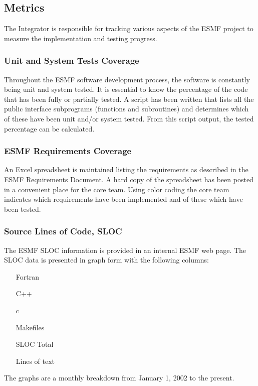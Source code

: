 \subsection{Metrics}

The Integrator is responsible for tracking various aspects of the
ESMF project to measure the implementation and testing progress.

\subsubsection{Unit and System Tests Coverage}
Throughout the ESMF software development process, the software is constantly
being unit and system tested. It is essential to know the percentage of the
code that has been fully or partially tested. A script has been written that 
lists all the public interface subprograms (functions and subroutines) and 
determines which of these have been unit and/or system tested. From this script
output, the tested percentage can be calculated.

\subsubsection{ESMF Requirements Coverage}
An Excel spreadsheet is maintained listing the requirements as described in the
ESMF Requirements Document. A hard copy of the spreadsheet has been posted in a
convenient place for the core team. Using color coding the core team indicates
which requirements have been implemented and of these which have been tested.

\subsubsection{Source Lines of Code, SLOC}
The ESMF SLOC information is provided in an internal ESMF web page. The
SLOC data is presented in graph form with the following columns:

\begin{enumerate}
\item[Fortran] 
\item[C++] 
\item[c] 
\item[Makefiles] 
\item[SLOC Total] 
\item[Lines of text] 
\end{enumerate}

The graphs are a monthly breakdown from January 1, 2002 to the present.
























